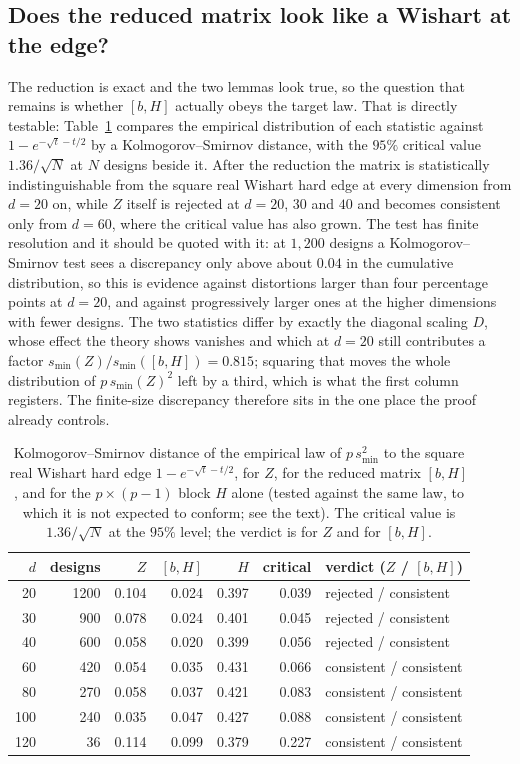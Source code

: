 \documentclass[11pt]{article}
\theoremstyle{definition}
\newcommand{\numSminRatioFirst}{0.815}
\begin{document}
\subsection{Does the reduced matrix look like a Wishart at the edge?}

The reduction is exact and the two lemmas look true, so the question that remains is whether
$[b,H]$ actually obeys the target law. That is directly testable: Table~\ref{tab:ks} compares the
empirical distribution of each statistic against $1-e^{-\sqrt t-t/2}$ by a Kolmogorov--Smirnov
distance, with the $95\%$ critical value $1.36/\sqrt N$ at $N$ designs beside it. After the
reduction the matrix is statistically indistinguishable from the square real Wishart hard edge at
every dimension from $d=20$ on, while $Z$ itself is rejected at $d=20$, $30$ and $40$ and becomes
consistent only from $d=60$, where the critical value has also grown. The test has finite
resolution and it should be quoted with it: at $1{,}200$ designs a Kolmogorov--Smirnov test sees a
discrepancy only above about $0.04$ in the cumulative distribution, so this is evidence against
distortions larger than four percentage points at $d=20$, and against progressively larger ones at
the higher dimensions with fewer designs. The two statistics differ by exactly the diagonal scaling
$D$, whose effect the theory shows vanishes and which at $d=20$ still contributes a factor
$s_{\min}(Z)/s_{\min}([b,H])=\numSminRatioFirst$; squaring that moves the whole distribution of
$p\,s_{\min}(Z)^2$ left by a third, which is what the first column registers. The finite-size
discrepancy therefore sits in the one place the proof already controls.

\begin{table}[t]
\centering\small
\caption{Kolmogorov--Smirnov distance of the empirical law of $p\,s_{\min}^2$ to the square real
Wishart hard edge $1-e^{-\sqrt t-t/2}$, for $Z$, for the reduced matrix $[b,H]$, and for the
$p\times(p-1)$ block $H$ alone (tested against the same law, to which it is not expected to
conform; see the text). The critical value is $1.36/\sqrt N$ at the $95\%$ level; the verdict is for
$Z$ and for $[b,H]$.}
\label{tab:ks}
\begin{tabular}{rrrrrrl}
\toprule
$d$ & designs & $Z$ & $[b,H]$ & $H$ & critical & verdict ($Z$ / $[b,H]$)\\
\midrule
20 & 1200 & 0.104 & 0.024 & 0.397 & 0.039 & rejected / consistent\\
30 & 900 & 0.078 & 0.024 & 0.401 & 0.045 & rejected / consistent\\
40 & 600 & 0.058 & 0.020 & 0.399 & 0.056 & rejected / consistent\\
60 & 420 & 0.054 & 0.035 & 0.431 & 0.066 & consistent / consistent\\
80 & 270 & 0.058 & 0.037 & 0.421 & 0.083 & consistent / consistent\\
100 & 240 & 0.035 & 0.047 & 0.427 & 0.088 & consistent / consistent\\
120 & 36 & 0.114 & 0.099 & 0.379 & 0.227 & consistent / consistent\\
\bottomrule
\end{tabular}
\end{table}
\end{document}
